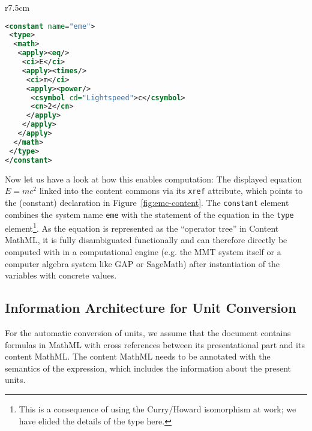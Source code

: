 \begin{wrapfigure}r{7.5cm}\vspace*{-1em}
\begin{lstlisting}[language=XML,morekeywords={constant,type,apply,math,ci,cn,csymbol},basicstyle=\footnotesize\sf]
<constant name="eme">
 <type>
  <math>
   <apply><eq/>
    <ci>E</ci>
    <apply><times/>
     <ci>m</ci>
     <apply><power/>
      <csymbol cd="Lightspeed">c</csymbol>
      <cn>2</cn>
     </apply>
    </apply>
   </apply>
  </math>
 </type>
</constant>
\end{lstlisting}
\caption{$E=mc^2$ in Content MathML}\label{fig:emc-content}\vspace*{-2em}
\end{wrapfigure}
Now let us have a look at how this enables computation: The displayed equation $E=mc^2$
linked into the content commons via its \lstinline|xref| attribute, which points to the
(constant) declaration in Figure~\ref{fig:emc-content}. The \lstinline|constant| element
combines the system name \lstinline|eme| with the statement of the equation in the
\lstinline|type| element\footnote{This is a consequence of using the Curry/Howard
  isomorphism at work; we have elided the details of the type here.}. As the equation is
represented as the ``operator tree'' in Content MathML, it is fully disambiguated
functionally and can therefore directly be computed with in a computational engine
(e.g. the MMT system itself or a computer algebra system like GAP or SageMath) after
instantiation of the variables with concrete values.


\subsection{Information Architecture for Unit Conversion}
For the automatic conversion of units, we assume that the document contains formulas
in MathML with cross references between its presentational part and its content MathML.
The content MathML needs to be annotated with the semantics of the expression, which
includes the information about the present units.



